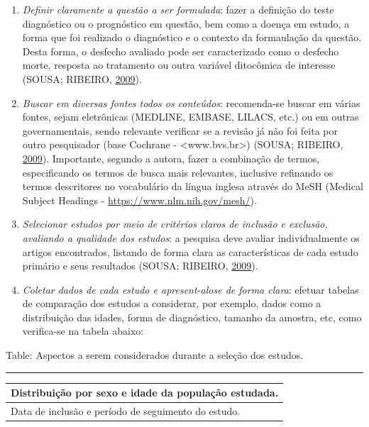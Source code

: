\documentclass[12pt,brazil,oneside]{book}
\begin{document}
\begin{enumerate}
\def\labelenumi{\alph{enumi}.}
\item
  \emph{Definir claramente a questão a ser formulada}: fazer a definição do teste diagnóstico ou o prognóstico em questão, bem como a doença em estudo, a forma que foi realizado o diagnóstico e o contexto da formaulação da questão. Desta forma, o desfecho avaliado pode ser caracterizado como o desfecho morte, resposta ao tratamento ou outra variável ditocômica de interesse (SOUSA; RIBEIRO, \protect\hyperlink{ref-Sousa2009}{2009}).
\item
  \emph{Buscar em diversas fontes todos os conteúdos}: recomenda-se buscar em várias fontes, sejam eletrônicas (MEDLINE, EMBASE, LILACS, etc.) ou em outras governamentais, sendo relevante verificar se a revisão já não foi feita por outro pesquisador (base Cochrane - \textless{}www.bvs.br\textgreater{}) (SOUSA; RIBEIRO, \protect\hyperlink{ref-Sousa2009}{2009}). Importante, segundo a autora, fazer a combinação de termos, especificando os termos de busca mais relevantes, inclusive refinando os termos descritores no vocabulário da língua inglesa através do MeSH (Medical Subject Headings - \url{https://www.nlm.nih.gov/mesh/}).
\item
  \emph{Selecionar estudos por meio de critérios claros de inclusão e exclusão, avaliando a qualidade dos estudos}: a pesquisa deve avaliar individualmente os artigos encontrados, listando de forma clara as características de cada estudo primário e seus resultados (SOUSA; RIBEIRO, \protect\hyperlink{ref-Sousa2009}{2009}).
\item
  \emph{Coletar dados de cada estudo e apresent-alose de forma clara}: efetuar tabelas de comparação dos estudos a considerar, por exemplo, dados como a distribuição das idades, forma de diagnóstico, tamanho da amostra, etc, como verifica-se na tabela abaixo:
\end{enumerate}

Table: \label{tab:metanalise}Aspectos a serem considerados durante a seleção dos estudos.

\begin{center}\rule{0.5\linewidth}{\linethickness}\end{center}

\begin{longtable}[]{@{}l@{}}
\toprule
\begin{minipage}[b]{0.85\columnwidth}\raggedright
Distribuição por sexo e idade da população estudada.\strut
\end{minipage}\tabularnewline
\midrule
\endhead
\begin{minipage}[t]{0.85\columnwidth}\raggedright
Data de inclusão e período de seguimento do estudo.\strut
\end{minipage}\tabularnewline
\bottomrule
\end{longtable}
\end{document}

